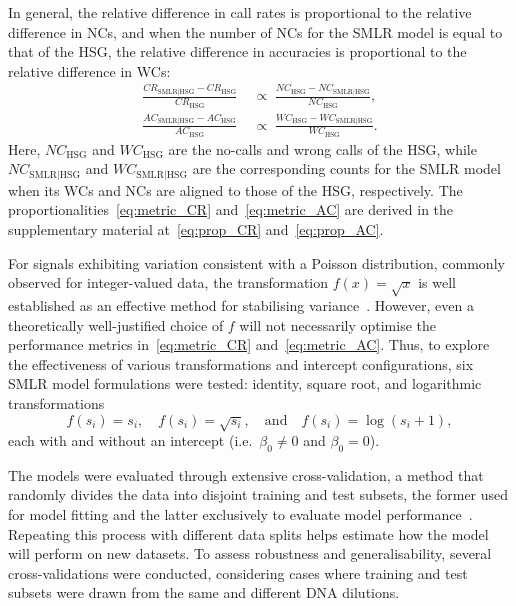 \documentclass[preprint,5p,times,11pt]{elsarticle}
\begin{document}
In general, the relative difference in call rates is proportional to the relative difference in NCs, and when the number of NCs for the SMLR model is equal to that of the HSG, the relative difference in accuracies is proportional to the relative difference in WCs:
\begin{align}
\frac{CR_{\text{SMLR}\mid\text{HSG}} - CR_{\text{HSG}}}{CR_{\text{HSG}}} \; &\propto \; \frac{NC_{\text{HSG}} - NC_{\text{SMLR}\mid\text{HSG}}}{NC_{\text{HSG}}},\label{eq:metric_CR} \\
\frac{AC_{\text{SMLR}\mid\text{HSG}} - AC_{\text{HSG}}}{AC_{\text{HSG}}} \; &\propto \; \frac{WC_{\text{HSG}} - WC_{\text{SMLR}\mid\text{HSG}}}{WC_{\text{HSG}}}.\label{eq:metric_AC}
\end{align}
Here, $NC_{\text{HSG}}$ and $WC_{\text{HSG}}$ are the no-calls and wrong calls of the HSG, while $NC_{\text{SMLR}\mid\text{HSG}}$ and $WC_{\text{SMLR}\mid\text{HSG}}$ are the corresponding counts for the SMLR model when its WCs and NCs are aligned to those of the HSG, respectively.
The proportionalities~\eqref{eq:metric_CR} and~\eqref{eq:metric_AC} are derived in the supplementary material at~\eqref{eq:prop_CR} and~\eqref{eq:prop_AC}.

For signals exhibiting variation consistent with a Poisson distribution, commonly observed for integer-valued data, the transformation $f\left(x\right) = \sqrt{x}$ is well established as an effective method for stabilising variance~\cite{bartlett}.
However, even a theoretically well-justified choice of $f$ will not necessarily optimise the performance metrics in~\eqref{eq:metric_CR} and~\eqref{eq:metric_AC}.
Thus, to explore the effectiveness of various transformations and intercept configurations, six SMLR model formulations were tested: identity, square root, and logarithmic transformations
\begin{equation*}
f\left(s_i\right) = s_i, \quad f\left(s_i\right) = \sqrt{s_i}, \quad \text{and} \quad f\left(s_i\right) = \log\left(s_i+1\right),
\end{equation*}
each with and without an intercept (i.e.~$\beta_0 \neq 0$ and $\beta_0 = 0$).

The models were evaluated through extensive cross-validation, a method that randomly divides the data into disjoint training and test subsets, the former used for model fitting and the latter exclusively to evaluate model performance~\cite{stone, picard}.
Repeating this process with different data splits helps estimate how the model will perform on new datasets.
To assess robustness and generalisability, several cross-validations were conducted, considering cases where training and test subsets were drawn from the same and different DNA dilutions.
\end{document}
